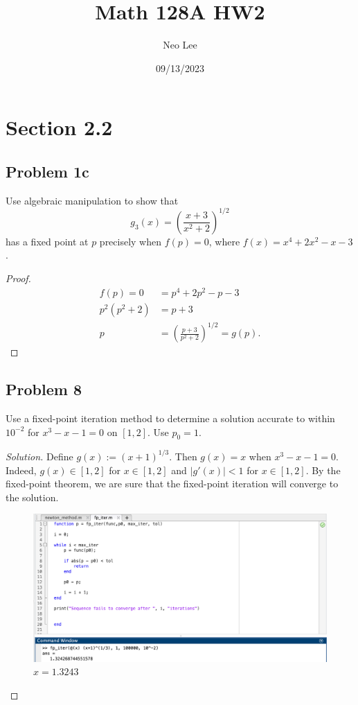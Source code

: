 \documentclass{article}
\title{Math 128A HW2}
\author{Neo Lee}
\date{09/13/2023}
\begin{document}
 

\maketitle 

\section*{Section 2.2}
\subsection*{Problem 1c}
Use algebraic manipulation to show that $$g_3(x)=\left(\frac{x+3}{x^2+2}\right)^{1/2}$$ has a fixed 
point at $p$ precisely when $f(p)=0$, where $f(x)=x^4+2x^2-x-3$.
\begin{proof}
    \begin{align*}
        f(p) = 0 & = p^4 + 2p^2 - p - 3 \\
        p^2(p^2 + 2) & = p + 3 \\
        p & = \left(\frac{p+3}{p^2+2}\right)^{1/2} = g(p).
    \end{align*}
\end{proof}

\subsection*{Problem 8}
Use a fixed-point iteration method to determine a solution accurate to within $10^{-2}$ for $x^3 
- x - 1 = 0$ on $[1,2]$. Use $p_0 = 1$.
\begin{proof}[Solution]
    Define $g(x):=(x+1)^{1/3}$. Then $g(x)=x$ when $x^3-x-1=0$. Indeed, $g(x) \in [1,2]$ for $x \in 
    [1,2]$ and $|g'(x)| < 1$ for $x\in[1,2]$. By the fixed-point theorem, we are sure that the 
    fixed-point iteration will converge to the solution. 
    
    \begin{figure}[htb!]
        \centering
        \includegraphics[scale=0.2]{2.2.8.png}
        \caption{$x = 1.3243$}
    \end{figure}
\end{proof}
\end{document}
